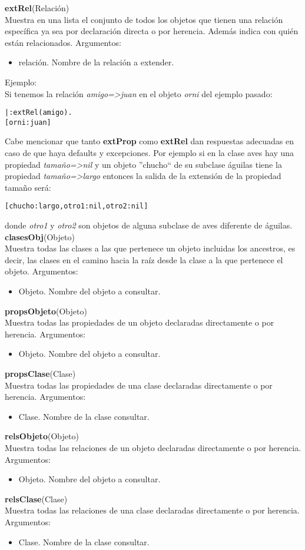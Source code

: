 \documentclass[11pt]{article}
\newcommand{\bt}{\begin{alltt}}
\newcommand{\et}{\end{alltt}}
\newcommand{\comando}[2]{
    \textbf{#1}(#2)\\
}
\newenvironment{args}{
    \newline
    Argumentos:
    \begin{itemize}
}{
    \end{itemize}
    \bigskip
}
\begin{document}
\comando{extRel}{Relación}
Muestra en una lista el conjunto de todos los objetos que tienen una relación específica ya sea
por declaración directa o por herencia. Además indica con quién están relacionados.
\begin{args}
    \item relación. Nombre de la relación a extender.
\end{args}
Ejemplo:\\
Si tenemos la relación \textit{amigo=>juan} en el objeto \textit{orni} del ejemplo pasado:
\bt
|: extRel(amigo).
[orni:juan]
\et

Cabe mencionar que tanto \textbf{extProp} como \textbf{extRel} dan respuestas adecuadas 
en caso de que haya defaults y excepciones. Por ejemplo si en la clase aves hay una propiedad
\textit{tamaño=>nil} y un objeto ''chucho`` de su subclase águilas tiene la propiedad 
\textit{tamaño=>largo} entonces la salida de la extensión de la propiedad tamaño será:
\bt
[chucho:largo,otro1:nil,otro2:nil]
\et
donde \emph{otro1} y \emph{otro2} son objetos de alguna subclase de aves diferente de águilas.\\

\comando{clasesObj}{Objeto}
Muestra todas las clases a las que pertenece un objeto incluidas los ancestros, es decir, las
clases en el camino hacia la raíz desde la clase a la que pertenece el objeto.
\begin{args}
    \item Objeto. Nombre del objeto a consultar.
\end{args}

\comando{propsObjeto}{Objeto}
Muestra todas las propiedades de un objeto declaradas directamente o por herencia.
\begin{args}
    \item Objeto. Nombre del objeto a consultar.
\end{args}

\comando{propsClase}{Clase}
Muestra todas las propiedades de una clase declaradas directamente o por herencia.
\begin{args}
    \item Clase. Nombre de la clase consultar.
\end{args}


\comando{relsObjeto}{Objeto}
Muestra todas las relaciones de un objeto declaradas directamente o por herencia.
\begin{args}
    \item Objeto. Nombre del objeto a consultar.
\end{args}

\comando{relsClase}{Clase}
Muestra todas las relaciones de una clase declaradas directamente o por herencia.
\begin{args}
    \item Clase. Nombre de la clase consultar.
\end{args}
\end{document}
